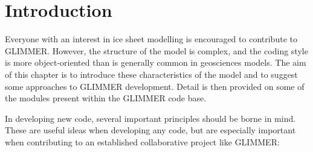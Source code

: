 \section{Introduction}

Everyone with an interest in ice sheet modelling is encouraged to contribute
to GLIMMER. However, the structure of the model is complex, and the coding
style is more object-oriented than is generally common in geosciences
models. The aim of this chapter is to introduce these characteristics of the
model and to suggest some approaches to GLIMMER development. Detail is then
provided on some of the modules present within the GLIMMER code base.

In developing new code, several important principles should be borne in
mind. These are useful ideas when developing any code, but are especially
important when contributing to an established collaborative project like
GLIMMER:
